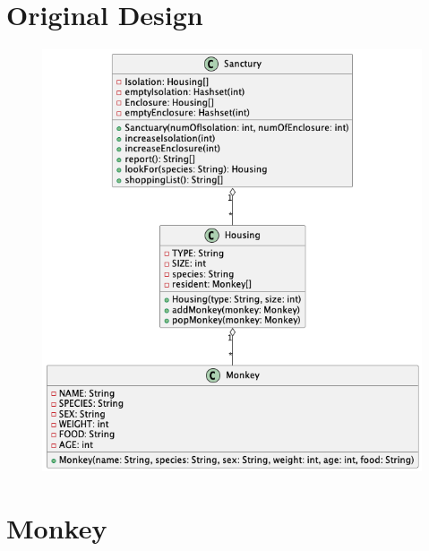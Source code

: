 \documentclass[12pt]{amsart}
\title{}
\author{}
\date{} %
\begin{document}
\section{Original Design}

\begin{figure}[H] %
\centering %
\includegraphics[width=1\textwidth]{uml.png} %
\end{figure}

\newpage

\section{Monkey}
\end{document}
